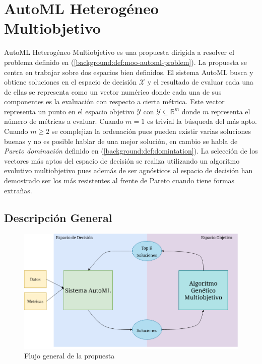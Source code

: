 
\chapter{AutoML Heterog\'eneo Multiobjetivo}\label{chapter:proposal}

AutoML Heterog\'eneo Multiobjetivo es una propuesta dirigida a resolver el problema definido en (\ref{background:def:moo-automl-problem}). La propuesta se centra en trabajar sobre dos espacios bien definidos. El sistema AutoML busca y obtiene soluciones en el espacio de decisi\'on $\mathcal{X}$ y el resultado  de evaluar cada una de ellas se representa como un vector num\'erico donde cada una de sus componentes es la evaluaci\'on con respecto a cierta m\'etrica. Este vector representa un punto en el espacio objetivo $\mathcal{Y}$ con $\mathcal{Y} \subseteq \mathbb{R}^m$ donde $m$ representa el n\'umero de m\'etricas a evaluar. Cuando $m = 1$ es trivial la b\'usqueda del m\'as apto. Cuando $m \ge 2$ se complejiza la ordenaci\'on pues pueden existir varias soluciones buenas y no es posible hablar de una mejor soluci\'on, en cambio se habla de \textit{Pareto dominaci\'on} definido en (\ref{background:def:domintation}). La selecci\'on de los vectores  m\'as aptos del espacio de decisi\'on se realiza utilizando un algoritmo evolutivo multiobjetivo pues adem\'as de ser agn\'osticos al espacio de decisi\'on han demostrado ser los m\'as resistentes al frente de Pareto cuando tiene formas extra\~nas.

\section{Descripci\'on General}
\begin{figure}[ht]
    \centering
    \includegraphics[scale=0.4]{Pictures/automl_moo_proposal2.png}
    \caption{Flujo general de la propuesta}
    \label{proposal:fig:flux}
\end{figure}


